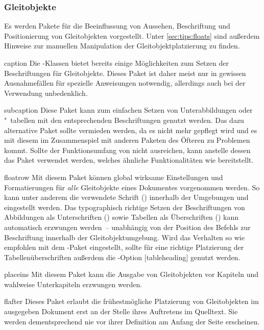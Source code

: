 \subsubsection{Gleitobjekte}
Es werden Pakete für die Beeinflussung von Aussehen, Beschriftung und 
Positionierung von Gleitobjekten vorgestellt. Unter \autoref{sec:tips:floats} 
sind außerdem Hinweise zur manuellen Manipulation der Gleitobjektplatzierung zu 
finden.

\begin{packages}
\item[caption]
  Die \KOMAScript-Klassen bietet bereits einige Möglichkeiten zum Setzen der 
  Beschriftungen für Gleitobjekte. Dieses Paket ist daher meist nur in gewissen
  Ausnahmefällen für spezielle Anweisungen notwendig, allerdings auch bei der 
  Verwendung unbedenklich.
\item[subcaption]
  Diese Paket kann zum einfachen Setzen von Unterabbildungen oder "~tabellen 
  mit den entsprechenden Beschriftungen genutzt werden. Das dazu alternative 
  Paket  sollte vermieden werden, da es nicht mehr gepflegt 
  wird und es mit diesem im Zusammenspiel mit anderen Paketen des Öfteren zu 
  Problemen kommt. Sollte der Funktionsumfang von  nicht 
  ausreichen, kann anstelle dessen das Paket  verwendet 
  werden, welches ähnliche Funktionalitäten wie  bereitstellt.
\item[floatrow]
  Mit diesem Paket können global wirksame Einstellungen und Formatierungen für 
  \emph{alle} Gleitobjekte eines Dokumentes vorgenommen werden. So kann unter 
  anderem die verwendete Schrift () 
  innerhalb der Umgebungen  und  
  eingestellt werden. Das typographisch richtige Setzen der Beschriftungen von 
  Abbildungen als Unterschriften 
  ()
  sowie Tabellen als Überschriften 
  ()
  kann automatisch erzwungen werden~-- unabhängig von der Position des Befehls 
  zur Beschriftung  innerhalb der Gleitobjektumgebung. Wird das 
  Verhalten so wie empfohlen mit dem -Paket eingestellt, 
  sollte für eine richtige Platzierung der Tabellenüberschriften außerdem die 
  \KOMAScript-Option [tableheading] genutzt werden.
\item[placeins]
  Mit diesem Paket kann die Ausgabe von Gleitobjekten vor Kapiteln und wahlweise
  Unterkapiteln erzwungen werden.
\item[flafter]
  Dieses Paket erlaubt die frühestmögliche Platzierung von Gleitobjekten im 
  ausgegeben Dokument erst an der Stelle ihres Auftretens im Quelltext. Sie 
  werden dementsprechend nie vor ihrer Definition am Anfang der Seite 
  erscheinen.
\end{packages}


